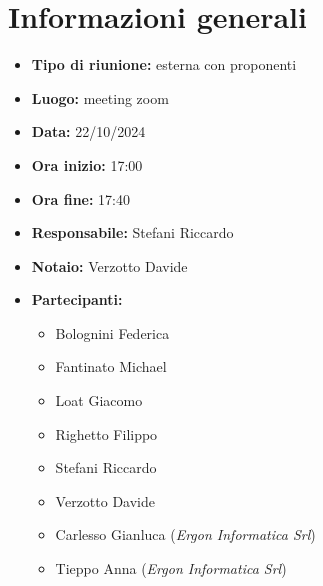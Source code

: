 \section{Informazioni generali}

\begin{itemize}
    \item \textbf{Tipo di riunione:} esterna con proponenti
    \item \textbf{Luogo:} meeting zoom
    \item \textbf{Data:} 22/10/2024
    \item \textbf{Ora inizio:} 17:00
    \item \textbf{Ora fine:} 17:40
    \item \textbf{Responsabile:} Stefani Riccardo
    \item \textbf{Notaio:} Verzotto Davide
    \item \textbf{Partecipanti:}
    \begin{itemize}
        \renewcommand{\labelitemii}{--}
        \item Bolognini Federica
        \item Fantinato Michael
        \item Loat Giacomo
        \item Righetto Filippo
        \item Stefani Riccardo
        \item Verzotto Davide
        \item Carlesso Gianluca (\emph{Ergon Informatica Srl})
        \item Tieppo Anna (\emph{Ergon Informatica Srl})
    \end{itemize}
\end{itemize}